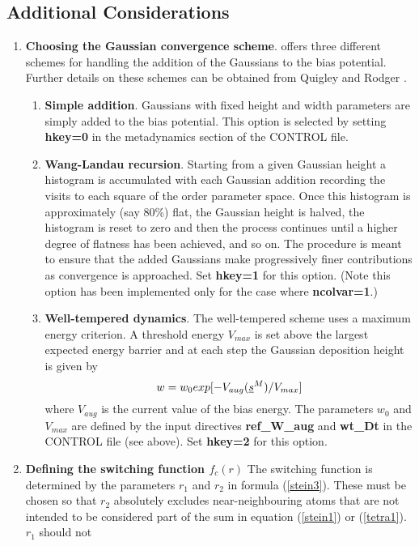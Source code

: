 \subsection{Additional Considerations}
\label{metadextras}
\begin{enumerate}
\item {\bf Choosing the Gaussian convergence scheme}. \D{} offers three
  different schemes for handling the addition of the Gaussians to the
  bias potential. Further details on these schemes can be obtained from
  Quigley and Rodger \cite{quigley-09a}.
\begin{enumerate}
\item {\bf Simple addition}. Gaussians with fixed height and width parameters 
  are simply added to the bias
  potential. This option is selected by setting {\bf hkey=0} in the
  metadynamics section of the CONTROL file.
\item {\bf Wang-Landau recursion}. Starting from a given Gaussian height a
  histogram is accumulated with each Gaussian addition recording the visits to
  each square of the order parameter space. Once this histogram is
  approximately (say 80\%) flat, the Gaussian height is halved, the histogram
  is reset to zero and then the process continues until a higher degree of
  flatness has been achieved, and so on. The procedure is meant to 
  ensure that the added Gaussians make progressively finer contributions as
  convergence is approached. Set {\bf hkey=1} for this option. (Note this
  option has been implemented only for the case where {\bf ncolvar=1}.)
\item {\bf Well-tempered dynamics}. The well-tempered scheme uses a maximum
  energy criterion. A threshold energy $V_{max}$ is set above the largest
  expected energy barrier and at each step the Gaussian deposition height is
  given by \[ w=w_{0}exp[-V_{aug}(\mbox{$\underline{s}$}^{M})/V_{max}] \] where $V_{aug}$ is
  the current value of the bias energy. The parameters
  $w_{0}$ and $V_{max}$ are defined by the input directives {\bf ref\_W\_aug}
  and {\bf wt\_Dt} in the CONTROL file (see above). Set {\bf hkey=2} for
  this option.
\end{enumerate}
\item {\bf Defining the switching function $f_{c}(r)$}\newline
  The switching function is determined by the parameters $r_{1}$ and $r_{2}$
  in formula (\ref{stein3}). These must be chosen so that $r_{2}$ absolutely
  excludes near-neighbouring atoms that are not intended to be considered part
  of the sum in equation (\ref{stein1}) or (\ref{tetra1}). $r_{1}$ should not

\end{enumerate}
